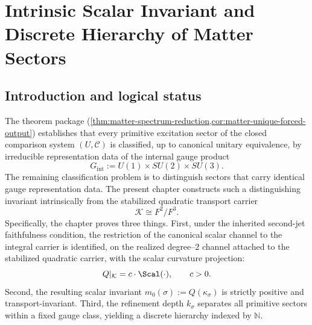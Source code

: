 \chapter{Intrinsic Scalar Invariant and Discrete Hierarchy of Matter Sectors}
\label{ch:matter-spectral}
\label{ch:matter}

\section{Introduction and logical status}
\label{sec:spectral-intro}

The theorem package
(\cref{thm:matter-spectrum-reduction,cor:matter-unique-forced-output})
establishes that every primitive excitation sector of the closed
comparison system \((U,\mathcal C)\) is classified, up to canonical
unitary equivalence, by irreducible representation data of the internal
gauge product
\[
  G_{\mathrm{int}} := U(1)\times SU(2)\times SU(3).
\]
The remaining classification problem is to distinguish sectors that
carry identical gauge representation data.
The present chapter constructs such a distinguishing invariant
intrinsically from the stabilized quadratic transport carrier
\[
  \mathcal K \cong F^2/F^3.
\]
Specifically, the chapter proves three things.
First, under the inherited second-jet faithfulness condition, the
restriction of the canonical scalar channel to the integral carrier is
identified, on the realized degree--\(2\) channel attached to the
stabilized quadratic carrier, with the scalar curvature projection:
\[
  Q|_{\mathcal K} = c \cdot \Scal(\cdot),\qquad c > 0.
\]
Second, the resulting scalar invariant $m_0(\sigma) := Q(\kappa_\sigma)$
is strictly positive and transport-invariant.
Third, the refinement depth $k_\sigma$ separates all primitive sectors
within a fixed gauge class, yielding a discrete hierarchy indexed by
$\mathbb N$.

